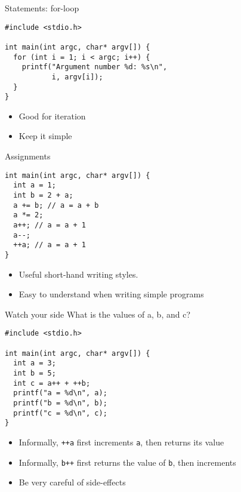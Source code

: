 \documentclass{beamer}
\begin{document}
\begin{frame}[fragile]{Statements: for-loop}
\begin{lstlisting}[frame=single]
#include <stdio.h>

int main(int argc, char* argv[]) {
  for (int i = 1; i < argc; i++) {
    printf("Argument number %d: %s\n",
           i, argv[i]);
  }
}
\end{lstlisting}
\begin{itemize}
\item Good for iteration
\item Keep it simple
\end{itemize}
\end{frame}


\begin{frame}[fragile]{Assignments}
\begin{lstlisting}[frame=single]
int main(int argc, char* argv[]) {
  int a = 1;
  int b = 2 + a;
  a += b; // a = a + b
  a *= 2;
  a++; // a = a + 1
  a--;
  ++a; // a = a + 1
}
\end{lstlisting}
\begin{itemize}
\item Useful short-hand writing styles.
\item Easy to understand when writing simple programs
\end{itemize}
\end{frame}


\begin{frame}[fragile]{Watch your side}
What is the values of a, b, and c?
\begin{lstlisting}[frame=single]
#include <stdio.h>

int main(int argc, char* argv[]) {
  int a = 3;
  int b = 5;
  int c = a++ + ++b;
  printf("a = %d\n", a);
  printf("b = %d\n", b);
  printf("c = %d\n", c);
}\end{lstlisting}
\pause
\begin{itemize}
\item Informally, \lstinline{++a} first increments \lstinline{a}, then returns its value
\item Informally, \lstinline{b++} first returns the value of \lstinline{b}, then increments
\item Be very careful of side-effects
\end{itemize}
\end{frame}
\end{document}
